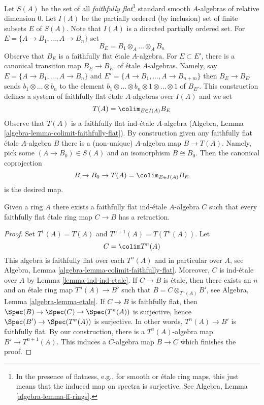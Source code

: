 \medskip\noindent
Let $S(A)$ be the set of all {\it faithfully flat}\footnote{In the presence
of flatness, e.g., for smooth or \'etale ring maps,
this just means that the induced map on spectra is surjective. See
Algebra, Lemma \ref{algebra-lemma-ff-rings}.}
standard smooth $A$-algebras of relative dimension $0$.
Let $I(A)$ be the partially ordered (by inclusion) set of finite
subsets $E$ of $S(A)$. Note that $I(A)$ is a directed partially
ordered set. For $E = \{A \to B_1, \ldots, A \to B_n\}$ set
$$
B_E = B_1 \otimes_A \ldots \otimes_A B_n
$$
Observe that $B_E$ is a faithfully flat \'etale $A$-algebra.
For $E \subset E'$, there is a canonical transition map $B_E \to B_{E'}$
of \'etale $A$-algebras. Namely, say $E = \{A \to B_1, \ldots, A \to B_n\}$
and $E' = \{A \to B_1, \ldots, A \to B_{n + m}\}$ then
$B_E \to B_{E'}$ sends $b_1 \otimes \ldots \otimes b_n$ to the
element $b_1 \otimes \ldots \otimes b_n \otimes 1 \otimes \ldots \otimes 1$
of $B_{E'}$. This construction defines a system of faithfully flat
\'etale $A$-algebras over $I(A)$ and we set
$$
T(A) = \colim_{E \in I(A)} B_E
$$
Observe that $T(A)$ is a faithfully flat ind-\'etale $A$-algebra
(Algebra, Lemma \ref{algebra-lemma-colimit-faithfully-flat}). By construction
given any faithfully flat \'etale $A$-algebra $B$ there is a (non-unique)
$A$-algebra map $B \to T(A)$. Namely, pick some $(A \to B_0) \in S(A)$
and an isomorphism $B \cong B_0$. Then the canonical coprojection
$$
B \to B_0 \to 
T(A) = \colim_{E \in I(A)} B_E
$$
is the desired map.

\begin{lemma}
\label{lemma-first-construction}
Given a ring $A$ there exists a faithfully flat ind-\'etale $A$-algebra $C$
such that every faithfully flat \'etale ring map $C \to B$ has a retraction.
\end{lemma}

\begin{proof}
Set $T^1(A) = T(A)$ and $T^{n + 1}(A) = T(T^n(A))$. Let
$$
C = \colim T^n(A)
$$
This algebra is faithfully flat over each $T^n(A)$ and in particular
over $A$, see
Algebra, Lemma \ref{algebra-lemma-colimit-faithfully-flat}.
Moreover, $C$ is ind-\'etale over $A$ by Lemma \ref{lemma-ind-ind-etale}.
If $C \to B$ is \'etale, then there exists an $n$ and an \'etale
ring map $T^n(A) \to B'$ such that $B = C \otimes_{T^n(A)} B'$, see
Algebra, Lemma \ref{algebra-lemma-etale}.
If $C \to B$ is faithfully flat, then $\Spec(B) \to \Spec(C) \to \Spec(T^n(A))$
is surjective, hence $\Spec(B') \to \Spec(T^n(A))$ is surjective.
In other words, $T^n(A) \to B'$ is faithfully flat.
By our construction, there is a $T^n(A)$-algebra map
$B' \to T^{n + 1}(A)$. This induces a $C$-algebra map $B \to C$
which finishes the proof.
\end{proof}

